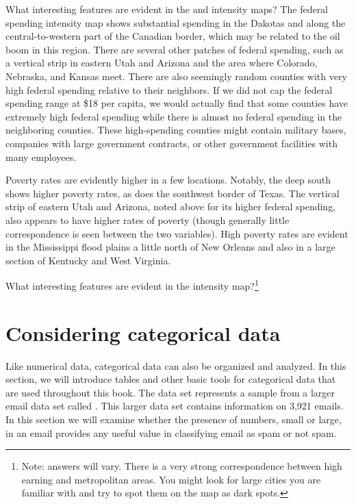 \begin{example}{What interesting features are evident in the  and  intensity maps?}
The federal spending intensity map shows substantial spending in the Dakotas and along the central-to-western part of the Canadian border, which may be related to the oil boom in this region. There are several other patches of federal spending, such as a vertical strip in eastern Utah and Arizona and the area where Colorado, Nebraska, and Kansas meet. There are also seemingly random counties with very high federal spending relative to their neighbors. If we did not cap the federal spending range at \$18 per capita, we would actually find that some counties have extremely high federal spending while there is almost no federal spending in the neighboring counties. These high-spending counties might contain military bases, companies with large government contracts, or other government facilities with many employees.

Poverty rates are evidently higher in a few locations. Notably, the deep south shows higher poverty rates, as does the southwest border of Texas. The vertical strip of eastern Utah and Arizona, noted above for its higher federal spending, also appears to have higher rates of poverty (though generally little correspondence is seen between the two variables).  High poverty rates are evident in the Mississippi flood plains a little north of New Orleans and also in a large section of Kentucky and West Virginia.
\end{example}

\begin{exercise}
What interesting features are evident in the  intensity map?\footnote{Note: answers will vary. There is a very strong correspondence between high earning and metropolitan areas. You might look for large cities you are familiar with and try to spot them on the map as dark spots.}
\end{exercise}



\section{Considering categorical data}
\label{categoricalData}


Like numerical data, categorical data can also be organized and analyzed. In this section, we will introduce tables and other basic tools for categorical data that are used throughout this book. The  data set represents a sample from a larger email data set called . This larger data set contains information on 3,921 emails. In this section we will examine whether the presence of numbers, small or large, in an email provides any useful value in classifying email as spam or not spam.

